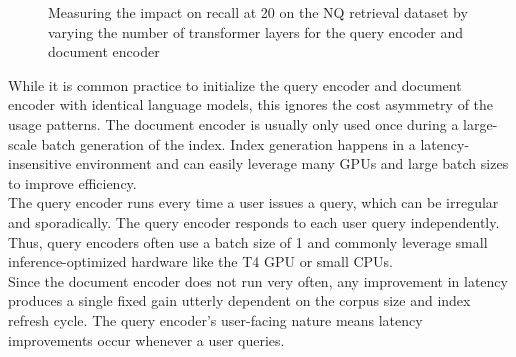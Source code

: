\begin{figure}[!htb]
    \centering
    \caption{Measuring the impact on recall at 20 on the NQ retrieval dataset by varying the number of transformer layers for the query encoder and document encoder \label{fig:asm-1}}
\end{figure}
While it is common practice to initialize the query encoder and document encoder with identical language models, this ignores the cost asymmetry of the usage patterns. The document encoder is usually only used once during a large-scale batch generation of the index. Index generation happens in a latency-insensitive environment and can easily leverage many GPUs and large batch sizes to improve efficiency.\\
The query encoder runs every time a user issues a query, which can be irregular and sporadically. The query encoder responds to each user query independently. Thus, query encoders often use a batch size of 1 and commonly leverage small inference-optimized hardware like the T4 GPU or small CPUs. \\
Since the document encoder does not run very often, any improvement in latency produces a single fixed gain utterly dependent on the corpus size and index refresh cycle. The query encoder's user-facing nature means latency improvements occur whenever a user queries. 
